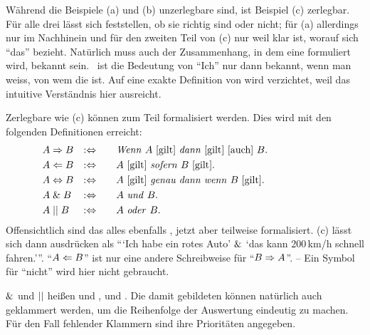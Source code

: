 Während die Beispiele (a) und (b) unzerlegbare  sind, ist Beispiel (c) zerlegbar.
Für alle drei  lässt sich feststellen, ob sie richtig sind oder nicht;
für (a) allerdings nur im Nachhinein und für den zweiten Teil von (c) nur weil klar ist, worauf sich \enquote{das} bezieht.
Natürlich muss auch der Zusammenhang, in dem eine  formuliert wird, bekannt sein.
\textZB\ ist die Bedeutung von \enquote{Ich} nur dann bekannt, wenn man weiss, von wem die  ist.
Auf eine exakte Definition von  wird verzichtet, weil das intuitive Verständnis hier ausreicht.

Zerlegbare  wie (c) können zum Teil formalisiert werden.
Dies wird mit den folgenden Definitionen erreicht:
%
\begin{align}
	& A \Rightarrow   B & :\Leftrightarrow & \qquad
	\text{\emph{Wenn} $A$ [gilt] \emph{dann} [gilt] [auch] $B$.}
	\\
	& A \Leftarrow   B & :\Leftrightarrow & \qquad
	\text{$A$ [gilt] \emph{sofern}          $B$ [gilt].}
	\\
	& A \Leftrightarrow B & :\Leftrightarrow & \qquad
	\text{$A$ [gilt] \emph{genau dann wenn} $B$ [gilt].}
	\\
	& A \;\&\;   B & :\Leftrightarrow & \qquad
	\text{$A$ \emph{und}  $B$.}
	\\
	& A \;||\;    B & :\Leftrightarrow & \qquad
	\text{$A$ \emph{oder} $B$.}
	&&&&&&&&&&
\end{align}
%
Offensichtlich sind das alles ebenfalls , jetzt aber teilweise formalisiert.
(c) lässt sich dann ausdrücken als \enquote{\enquote{Ich habe ein rotes Auto} $\&$ \enquote{das kann 200\,km/h schnell fahren.}}.
\enquote{$A \Leftarrow B$} ist nur eine andere Schreibweise für \enquote{$B \Rightarrow A$}.
-- Ein Symbol für \enquote{nicht} wird hier nicht gebraucht.

$\&$\hidden{\glsIdxPl{\metaand}} und $||$\hidden{\glsIdxPl{\metaor}} heißen  und ,  und  .
Die damit gebildeten  können natürlich auch geklammert werden, um die Reihenfolge der Auswertung eindeutig zu machen.
Für den Fall fehlender Klammern sind ihre Prioritäten  angegeben.

